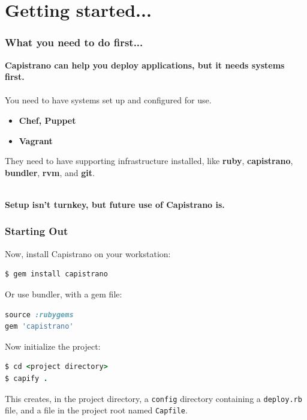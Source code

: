 \documentclass[t,handout]{beamer}
\begin{document}
\section{Getting started...}
\begin{frame}
\frametitle{What you need to do first...}
{\bf Capistrano can help you deploy applications, but it needs systems first.} \\~\\
You need to have systems set up and configured for use.
\begin{small}
\begin{itemize}
\item {\bf Chef, Puppet}
\item {\bf Vagrant}
\end{itemize}
\end{small}
They need to have supporting infrastructure installed, like {\bf ruby}, {\bf capistrano}, {\bf bundler}, {\bf rvm}, and {\bf git}.\\~\\
\begin{center}
{\bf Setup isn't turnkey, but future use of Capistrano is.}
\end{center}
\end{frame}


\begin{frame}[fragile]
\frametitle{Starting Out}
Now, install Capistrano on your workstation:\\
\begin{lstlisting}[frame=none,language=Ruby,basicstyle=\scriptsize\ttfamily\color{black},]
$ gem install capistrano
\end{lstlisting}
Or use bundler, with a gem file:
\begin{lstlisting}[frame=none,language=Ruby,basicstyle=\scriptsize\ttfamily\color{black},]
source :rubygems
gem 'capistrano'
\end{lstlisting}
Now initialize the project:
\begin{lstlisting}[frame=none,language=Ruby,basicstyle=\scriptsize\ttfamily\color{black},]
$ cd <project directory>
$ capify .
\end{lstlisting}
This creates, in the project directory, a {\small\tt config} directory containing a {\small\tt deploy.rb} file, and a file in the project root named {\small\tt Capfile}.
\end{frame}
\end{document}
